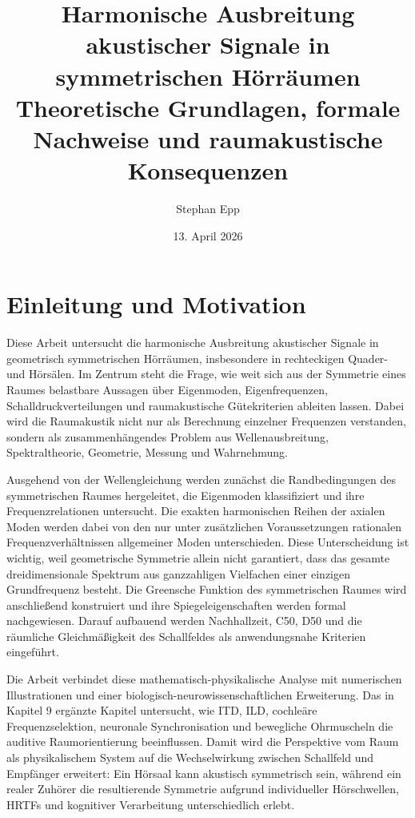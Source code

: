 ﻿\documentclass[12pt, a4paper]{article}
\title{\textbf{Harmonische Ausbreitung akustischer Signale in symmetrischen Hörräumen}\\
Theoretische Grundlagen, formale Nachweise und raumakustische Konsequenzen}
\date{13. April 2026}
\author{Stephan Epp}
\theoremstyle{definition}
\theoremstyle{remark}
\begin{document}
\maketitle
\tableofcontents
\newpage

\section{Einleitung und Motivation}
Diese Arbeit untersucht die harmonische Ausbreitung akustischer Signale in geometrisch
symmetrischen Hörräumen, insbesondere in rechteckigen Quader- und Hörsälen. Im Zentrum
steht die Frage, wie weit sich aus der Symmetrie eines Raumes belastbare Aussagen über
Eigenmoden, Eigenfrequenzen, Schalldruckverteilungen und raumakustische Gütekriterien
ableiten lassen. Dabei wird die Raumakustik nicht nur als Berechnung einzelner Frequenzen
verstanden, sondern als zusammenhängendes Problem aus Wellenausbreitung, Spektraltheorie,
Geometrie, Messung und Wahrnehmung.

Ausgehend von der Wellengleichung werden zunächst die Randbedingungen des symmetrischen
Raumes hergeleitet, die Eigenmoden klassifiziert und ihre Frequenzrelationen untersucht.
Die exakten harmonischen Reihen der axialen Moden werden dabei von den nur unter
zusätzlichen Voraussetzungen rationalen Frequenzverhältnissen allgemeiner Moden
unterschieden. Diese Unterscheidung ist wichtig, weil geometrische Symmetrie allein
nicht garantiert, dass das gesamte dreidimensionale Spektrum aus ganzzahligen Vielfachen
einer einzigen Grundfrequenz besteht. Die Greensche Funktion des symmetrischen Raumes
wird anschließend konstruiert und ihre Spiegeleigenschaften werden formal nachgewiesen.
Darauf aufbauend werden Nachhallzeit, C50, D50 und die räumliche Gleichmäßigkeit des
Schallfeldes als anwendungsnahe Kriterien eingeführt.

Die Arbeit verbindet diese mathematisch-physikalische Analyse mit numerischen
Illustrationen und einer biologisch-neurowissenschaftlichen Erweiterung. Das in Kapitel
9 ergänzte Kapitel untersucht, wie ITD, ILD, cochleäre Frequenzselektion, neuronale
Synchronisation und bewegliche Ohrmuscheln die auditive Raumorientierung beeinflussen.
Damit wird die Perspektive vom Raum als physikalischem System auf die Wechselwirkung
zwischen Schallfeld und Empfänger erweitert: Ein Hörsaal kann akustisch symmetrisch
sein, während ein realer Zuhörer die resultierende Symmetrie aufgrund individueller
Hörschwellen, HRTFs und kognitiver Verarbeitung unterschiedlich erlebt.
\end{document}
